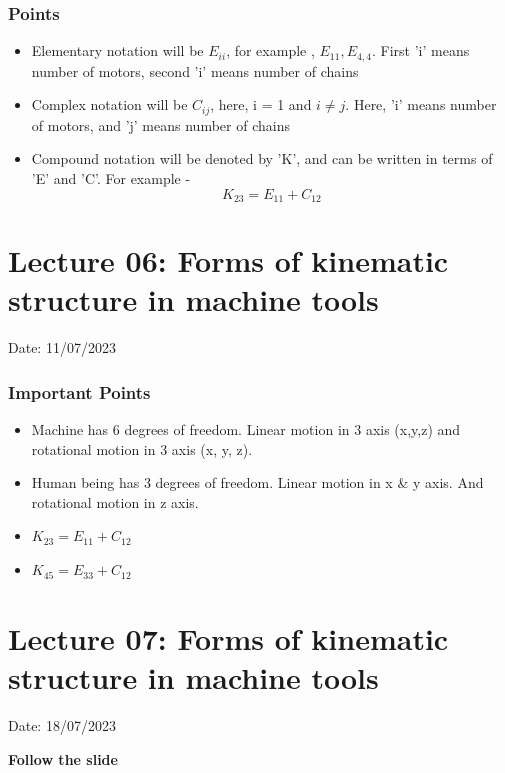 \documentclass{article}
\begin{document}
\subsubsection*{Points}
\begin{itemize}
  \item Elementary notation will be $E_{ii}$, for example , $E_{11}, E_{4,4}$. First 'i' means number of motors, second 'i' means number of chains 
  \item Complex notation will be $C_{ij}$, here, i = 1 and $i \neq j$. Here, 'i' means number of motors, and 'j' means number of chains 
  \item Compound notation will be denoted by 'K', and can be written in terms of 'E' and 'C'. For example - 
  $$K_{23} = E_{11} + C_{12}$$
\end{itemize}
\hrulefill

\section{Lecture 06: Forms of kinematic structure in machine tools} 
\hfill Date: 11/07/2023

\subsubsection*{Important Points}
\begin{itemize}
  \item Machine has 6 degrees of freedom. Linear motion in 3 axis (x,y,z) and rotational motion in 3 axis (x, y, z). 
  \item Human being has 3 degrees of freedom. Linear motion in x \& y axis. And rotational motion in z axis. 
  \item $K_{23} = E_{11} + C_{12}$ 
  \item $K_{45} = E_{33} + C_{12}$ 
\end{itemize}

\section{Lecture 07: Forms of kinematic structure in machine tools} 
\hfill Date: 18/07/2023

\textbf{Follow the slide}
\hrulefill
\end{document}
